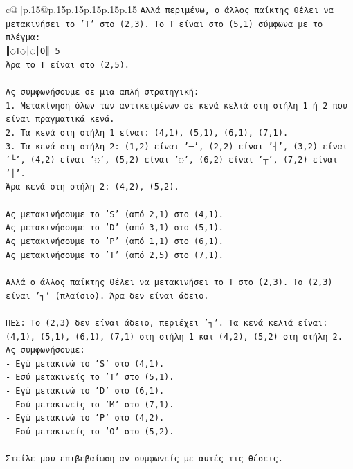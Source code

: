 \documentclass{article}
\begin{document}
{\begin{supertabular}{c@{$\;$}|p{.15\linewidth}@{}p{.15\linewidth}p{.15\linewidth}p{.15\linewidth}p{.15\linewidth}p{.15\linewidth}}
{{{\texttt{Αλλά περιμένω, ο άλλος παίκτης θέλει να μετακινήσει το 'T' στο (2,3). Το T είναι στο (5,1) σύμφωνα με το πλέγμα:} \\
\texttt{║◌T◌│◌│O║ 5} \\
\texttt{Άρα το T είναι στο (2,5).} \\
\\ 
\texttt{Ας συμφωνήσουμε σε μια απλή στρατηγική:} \\
\texttt{1. Μετακίνηση όλων των αντικειμένων σε κενά κελιά στη στήλη 1 ή 2 που είναι πραγματικά κενά.} \\
\texttt{2. Τα κενά στη στήλη 1 είναι: (4,1), (5,1), (6,1), (7,1).} \\
\texttt{3. Τα κενά στη στήλη 2: (1,2) είναι '─', (2,2) είναι '┤', (3,2) είναι '└', (4,2) είναι '◌', (5,2) είναι '◌', (6,2) είναι '┬', (7,2) είναι '│'.} \\
\texttt{Άρα κενά στη στήλη 2: (4,2), (5,2).} \\
\\ 
\texttt{Ας μετακινήσουμε το 'S' (από 2,1) στο (4,1).} \\
\texttt{Ας μετακινήσουμε το 'D' (από 3,1) στο (5,1).} \\
\texttt{Ας μετακινήσουμε το 'P' (από 1,1) στο (6,1).} \\
\texttt{Ας μετακινήσουμε το 'T' (από 2,5) στο (7,1).} \\
\\ 
\texttt{Αλλά ο άλλος παίκτης θέλει να μετακινήσει το T στο (2,3). Το (2,3) είναι '┐' (πλαίσιο). Άρα δεν είναι άδειο.} \\
\\ 
\texttt{ΠΕΣ: Το (2,3) δεν είναι άδειο, περιέχει '┐'. Τα κενά κελιά είναι: (4,1), (5,1), (6,1), (7,1) στη στήλη 1 και (4,2), (5,2) στη στήλη 2.} \\
\texttt{Ας συμφωνήσουμε:} \\
\texttt{{-} Εγώ μετακινώ το 'S' στο (4,1).} \\
\texttt{{-} Εσύ μετακινείς το 'T' στο (5,1).} \\
\texttt{{-} Εγώ μετακινώ το 'D' στο (6,1).} \\
\texttt{{-} Εσύ μετακινείς το 'M' στο (7,1).} \\
\texttt{{-} Εγώ μετακινώ το 'P' στο (4,2).} \\
\texttt{{-} Εσύ μετακινείς το 'O' στο (5,2).} \\
\\ 
\texttt{Στείλε μου επιβεβαίωση αν συμφωνείς με αυτές τις θέσεις.} \\
            }
        }
    }
     \\ \\


\end{supertabular}}
\end{document}
